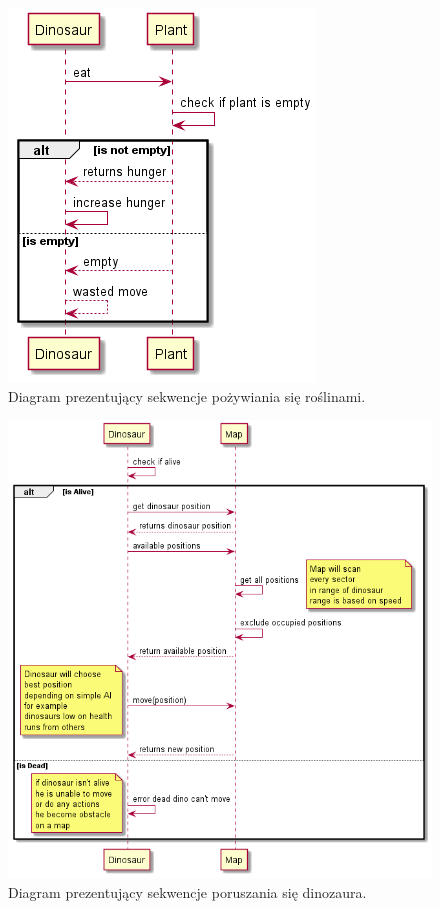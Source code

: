 \begin{figure}[h!]
    \centering
    \includegraphics[scale=0.64]{images/sequence/sequence_eat.png}
    \caption{Diagram prezentujący sekwencje pożywiania się roślinami.}
    \label{fig:seat}
\end{figure}
\newpage
\begin{figure}[h!]
    \centering
    \includegraphics[scale=0.67]{images/sequence/sequence_move.png}
    \caption{Diagram prezentujący sekwencje poruszania się dinozaura.}
    \label{fig:smove}
\end{figure}
\newpage
